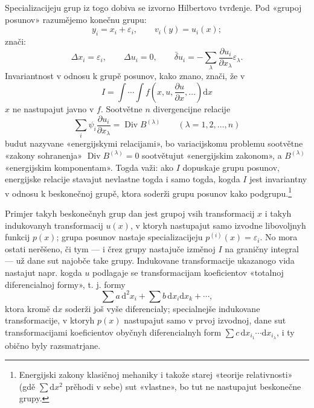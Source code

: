 \documentclass[11pt]{article}
\providecommand{\eps}{\varepsilon}
\providecommand{\D}{\Delta}
\providecommand{\p}{\partial}
\providecommand{\dd}{\mathrm d}
\DeclareMathOperator{\Div}{Div}
\providecommand{\bd}{\bar{\delta}}
\begin{document}
Specializacijeju grup iz togo dobiva se izvorno Hilbertovo tvrđenje. Pod «grupoj posunov» razumějemo konečnu grupu:
\[
y_i=x_i+\eps_i,\qquad v_i(y)=u_i(x);
\]
znači:
\[
\D x_i=\eps_i,\qquad \D u_i=0,\qquad
\bd u_i=-\sum_\lambda\frac{\p u_i}{\p x_\lambda}\eps_\lambda.
\]
Invariantnost v odnosu k grupě posunov, kako znano, znači, že v
\[
I=\int\!\cdots\!\int f\!\left(x,u,\frac{\p u}{\p x},\ldots\right)\dd x
\]
\(x\) ne nastupajut javno v \(f\). Sootvětne \(n\) divergencijne relacije
\[
\sum_i\psi_i\frac{\p u_i}{\p x_\lambda}=\Div B^{(\lambda)}
\qquad(\lambda=1,2,\ldots,n)
\]
budut nazyvane «energijskymi relacijami», bo variacijskomu problemu sootvětne «zakony sohranenja» \(\Div B^{(\lambda)}=0\) sootvětujut «energijskim zakonom», a \(B^{(\lambda)}\) «energijskim komponentam». Togda važi: ako \(I\) dopuskaje grupu posunov, energijske relacije stavajut nevlastne togda i samo togda, kogda \(I\) jest invariantny v odnosu k beskonečnoj grupě, ktora soderži grupu posunov kako podgrupu.\footnote{Energijski zakony klasičnoj mehaniky i takože starej «teorije relativnosti» (gdě \(\sum \dd x^2\) prěhodi v sebe) sut «vlastne», bo tut ne nastupajut beskonečne grupy.}

Primjer takyh beskonečnyh grup dan jest grupoj vsih transformacij \(x\) i takyh indukovanyh transformacij \(u(x)\), v ktoryh nastupajut samo izvodne libovoljnyh funkcij \(p(x)\); grupa posunov nastaje specializacijeju \(p^{(i)}(x)=\eps_i\). No mora ostati nerěšeno, či tym --- i črez grupy nastajuče izměnoj \(I\) na graničny integral --- už dane sut najobče take grupy. Indukovane transformacije ukazanogo vida nastajut napr. kogda \(u\) podlagaje se transformacijam koeficientov «totalnoj diferencialnoj formy», t. j. formy
\[
\sum a\,\dd^2x_i+\sum b\,\dd x_i\dd x_k+\cdots,
\]
ktora kromě \(\dd x\) soderži još vyše diferencialy; specialnejše indukovane transformacije, v ktoryh \(p(x)\) nastupajut samo v prvoj izvodnoj, dane sut transformacijami koeficientov obyčnyh diferencialnyh form \(\sum c\,\dd x_{i_1}\cdots \dd x_{i_\lambda}\), i ty obično byly razsmatrjane.
\end{document}

